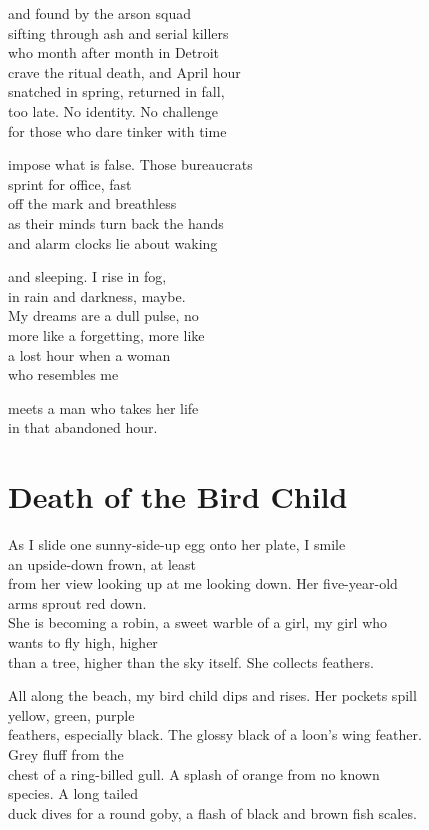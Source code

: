 \documentclass[twoside,10pt]{book}
\begin{document}
and found by the arson squad\\
sifting through ash and serial killers\\
who month after month in Detroit\\
crave the ritual death, and April hour\\
snatched in spring, returned in fall,\\
too late. No identity. No challenge\\
for those who dare tinker with time

impose what is false. Those bureaucrats\\
sprint for office, fast\\
off the mark and breathless\\
as their minds turn back the hands\\
and alarm clocks lie about waking

and sleeping. I rise in fog,\\
in rain and darkness, maybe.\\
My dreams are a dull pulse, no\\
more like a forgetting, more like\\
a lost hour when a woman\\
who resembles me

meets a man who takes her life\\
in that abandoned hour.


\clearpage
\section{Death of the Bird Child}

As I slide one sunny-side-up egg onto her plate, I smile\\
an upside-down frown, at least\\
from her view looking up at me looking down. Her five-year-old\\
arms sprout red down.\\
She is becoming a robin, a sweet warble of a girl, my girl who\\
wants to fly high, higher\\
than a tree, higher than the sky itself. She collects feathers.

All along the beach, my bird child dips and rises. Her pockets spill\\
yellow, green, purple\\
feathers, especially black. The glossy black of a loon's wing feather.\\
Grey fluff from the\\
chest of a ring-billed gull. A splash of orange from no known\\
species. A long tailed\\
duck dives for a round goby, a flash of black and brown fish scales.
\end{document}
